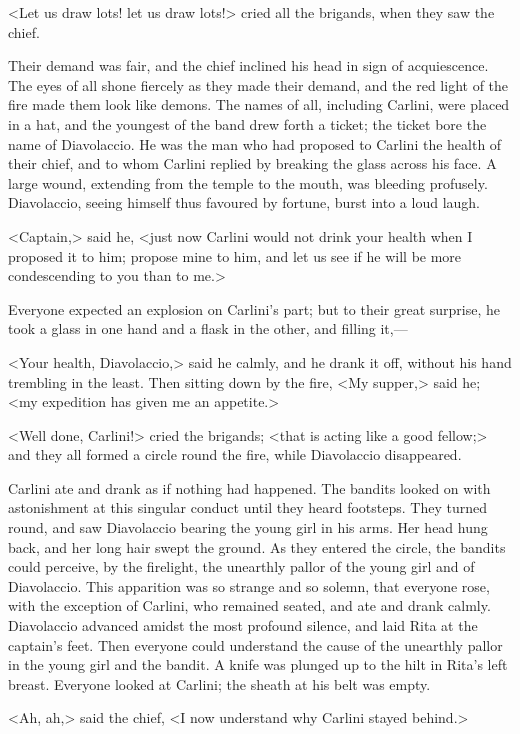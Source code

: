 {<Let us draw lots! let us draw lots!> cried all the brigands, when they saw the chief. 

Their demand was fair, and the chief inclined his head in sign of acquiescence. The eyes of all shone fiercely as they made their demand, and the red light of the fire made them look like demons. The names of all, including Carlini, were placed in a hat, and the youngest of the band drew forth a ticket; the ticket bore the name of Diavolaccio. He was the man who had proposed to Carlini the health of their chief, and to whom Carlini replied by breaking the glass across his face. A large wound, extending from the temple to the mouth, was bleeding profusely. Diavolaccio, seeing himself thus favoured by fortune, burst into a loud laugh. 

<Captain,> said he, <just now Carlini would not drink your health when I proposed it to him; propose mine to him, and let us see if he will be more condescending to you than to me.> 

Everyone expected an explosion on Carlini's part; but to their great surprise, he took a glass in one hand and a flask in the other, and filling it,— 

<Your health, Diavolaccio,> said he calmly, and he drank it off, without his hand trembling in the least. Then sitting down by the fire, <My supper,> said he; <my expedition has given me an appetite.> 

<Well done, Carlini!> cried the brigands; <that is acting like a good fellow;> and they all formed a circle round the fire, while Diavolaccio disappeared. 

Carlini ate and drank as if nothing had happened. The bandits looked on with astonishment at this singular conduct until they heard footsteps. They turned round, and saw Diavolaccio bearing the young girl in his arms. Her head hung back, and her long hair swept the ground. As they entered the circle, the bandits could perceive, by the firelight, the unearthly pallor of the young girl and of Diavolaccio. This apparition was so strange and so solemn, that everyone rose, with the exception of Carlini, who remained seated, and ate and drank calmly. Diavolaccio advanced amidst the most profound silence, and laid Rita at the captain's feet. Then everyone could understand the cause of the unearthly pallor in the young girl and the bandit. A knife was plunged up to the hilt in Rita's left breast. Everyone looked at Carlini; the sheath at his belt was empty. 

<Ah, ah,> said the chief, <I now understand why Carlini stayed behind.> 

}

